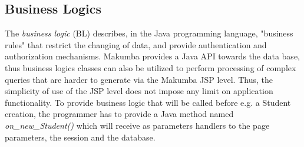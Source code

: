 \documentclass{llncs}
\begin{document}
\subsection{Business Logics}
The \textit{business logic} (BL) describes, in the Java programming language, "business rules" that restrict the changing of data, and provide authentication and authorization mechanisms. Makumba provides a Java API towards the data base, thus business logics classes can also be utilized to perform processing of complex queries that are harder to generate via the Makumba JSP level. Thus, the simplicity of use of the JSP level does not impose any limit on application functionality. To provide business logic that will be called before e.g. a Student creation, the programmer has to provide a Java method named \textit{on\_new\_Student()} which will receive as parameters handlers to the page parameters, the session and the database.


\end{document}
